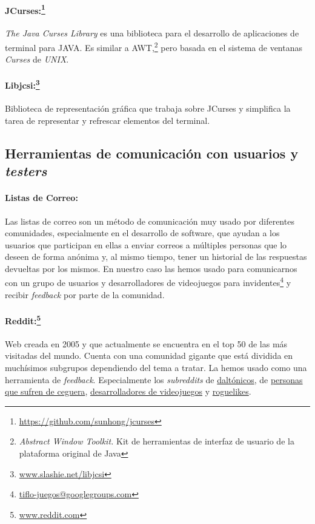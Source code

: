 \paragraph{JCurses:\protect\footnote{\protect\url{https://github.com/sunhong/jcurses}}} \textit{The Java Curses Library} es una biblioteca para el desarrollo de aplicaciones de terminal para JAVA. Es similar a AWT,\footnote{\textit{Abstract Window Toolkit.} Kit de herramientas de interfaz de usuario de la plataforma original de Java} pero basada en el sistema de ventanas \textit{Curses} de \textit{UNIX}.

\paragraph{Libjcsi:\protect\footnote{\protect\url{www.slashie.net/libjcsi}}} Biblioteca de representación gráfica que trabaja sobre JCurses y simplifica la tarea de representar y refrescar elementos del terminal.

\subsection{Herramientas de comunicación con usuarios y \textit{testers}}

\paragraph{Listas de Correo:} Las listas de correo son un método de comunicación muy usado por diferentes comunidades, especialmente en el desarrollo de software, que ayudan a los usuarios que participan en ellas a enviar correos a múltiples personas que lo deseen de forma anónima y, al mismo tiempo, tener un historial de las respuestas devueltas por los mismos. En nuestro caso las hemos usado para comunicarnos con un grupo de usuarios y desarrolladores de videojuegos para invidentes\footnote{\url{tiflo-juegos@googlegroups.com}} y recibir \textit{feedback} por parte de la comunidad.

 \paragraph{Reddit:\protect\footnote{\protect\url{www.reddit.com}}} Web creada en 2005 y que actualmente se encuentra en el top 50 de las más visitadas del mundo. Cuenta con una comunidad gigante que está dividida en muchísimos subgrupos dependiendo del tema a tratar. La hemos usado como una herramienta de \textit{feedback}. Especialmente los \textit{subreddits} de \href{https://www.reddit.com/r/ColorBlind/}{daltónicos}, de \href{https://www.reddit.com/r/blind/}{personas que sufren de ceguera}, \href{https://www.reddit.com/r/gamedev/}{desarrolladores de videojuegos} y \href{https://www.reddit.com/r/roguelikes/}{roguelikes}.

